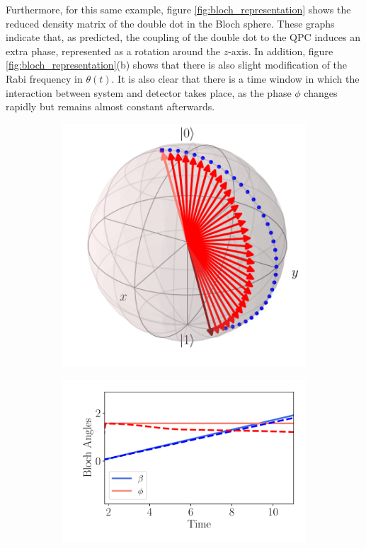 \documentclass{article}
\begin{document}
Furthermore, for this same example, figure \eqref{fig:bloch_representation} shows the reduced 
density matrix of the double dot in the Bloch sphere. These graphs indicate that, as predicted,
the coupling of the double dot to the QPC induces an extra phase, represented as a rotation around the 
$z$-axis. In addition, figure \ref{fig:bloch_representation}(b) shows that there is also slight modification of the Rabi frequency in $\theta (t)$. It is also clear that there is a 
time window in which 
the interaction between system and detector takes place, as the phase $\phi$ changes rapidly but 
remains almost constant afterwards. 

\begin{figure}[h]
    \centering
    \begin{subfigure}[b]{0.4\textwidth}
        \includegraphics[width=\textwidth]{figures/report_04_2025/bloch_sphere.pdf}
        \caption{}
    \end{subfigure}
    \hspace{0.001\textwidth}
    \begin{subfigure}[b]{0.5\textwidth}
        \includegraphics[width=\textwidth]{figures/report_04_2025/bloch_angles.pdf}

\end{subfigure}
\end{figure}
\end{document}
